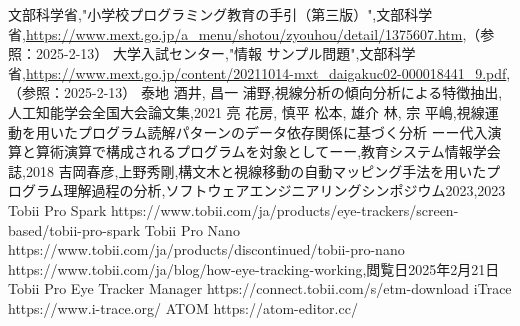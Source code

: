 \documentclass[paper=a4paper,fontsize=11pt]{jlreq}
\begin{document}
\begin{thebibliography}{99}
   文部科学省,"小学校プログラミング教育の手引（第三版）",文部科学省,\url{https://www.mext.go.jp/a_menu/shotou/zyouhou/detail/1375607.htm},（参照：2025-2-13）
   大学入試センター,"情報 サンプル問題",文部科学省,\url{https://www.mext.go.jp/content/20211014-mxt_daigakuc02-000018441_9.pdf},（参照：2025-2-13）
   泰地 酒井, 昌一 浦野,視線分析の傾向分析による特徴抽出,人工知能学会全国大会論文集,2021
   亮 花房, 慎平 松本, 雄介 林, 宗 平嶋,視線運動を用いたプログラム読解パターンのデータ依存関係に基づく分析
  ーー代入演算と算術演算で構成されるプログラムを対象としてーー,教育システム情報学会誌,2018
   吉岡春彦,上野秀剛,構文木と視線移動の自動マッピング手法を用いたプログラム理解過程の分析,ソフトウェアエンジニアリングシンポジウム2023,2023
   Tobii Pro Spark https://www.tobii.com/ja/products/eye-trackers/screen-based/tobii-pro-spark
   Tobii Pro Nano https://www.tobii.com/ja/products/discontinued/tobii-pro-nano
   https://www.tobii.com/ja/blog/how-eye-tracking-working,閲覧日2025年2月21日
   Tobii Pro Eye Tracker Manager https://connect.tobii.com/s/etm-download
   iTrace https://www.i-trace.org/
   ATOM https://atom-editor.cc/
\end{thebibliography}
\end{document}
